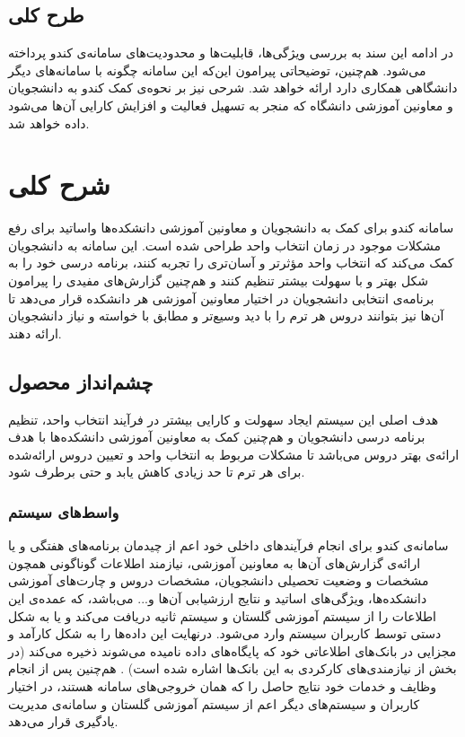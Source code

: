 \documentclass{report}
\begin{document}
\subsection{طرح کلی}
در ادامه این سند به بررسی ویژگی‌ها، قابلیت‌ها و محدودیت‌های سامانه‌ی کندو پرداخته می‌شود. هم‌چنین، توضیحاتی پیرامون این‌که این سامانه چگونه با سامانه‌های دیگر دانشگاهی همکاری دارد ارائه خواهد شد. شرحی نیز بر نحوه‌ی کمک کندو به دانشجویان و معاونین آموزشی دانشگاه که منجر به تسهیل فعالیت و افزایش کارایی آن‌ها
می‌شود داده خواهد شد.
  \section{شرح کلی}
  سامانه کندو برای کمک به دانشجویان و معاونین آموزشی دانشکده‌ها واساتید برای رفع مشکلات موجود در زمان انتخاب واحد طراحی شده است. این سامانه به دانشجویان کمک می‌کند که انتخاب واحد مؤثرتر و آسان‌تری را تجربه کنند، برنامه درسی خود را به شکل بهتر و با سهولت بیشتر تنظیم کنند و هم‌چنین گزارش‌های مفیدی را پیرامون  برنامه‌ی انتخابی دانشجویان در اختیار معاونین آموزشی هر دانشکده  قرار می‌دهد تا آن‌ها نیز بتوانند دروس هر ترم را با دید وسیع‌تر و مطابق با خواسته و نیاز  دانشجویان ارائه دهند.
  \subsection{چشم‌انداز محصول}
     هدف اصلی این سیستم ایجاد سهولت و کارایی بیشتر در فرآیند انتخاب واحد، تنظیم برنامه درسی دانشجویان و هم‌چنین کمک به معاونین  آموزشی دانشکده‌ها با هدف ارائه‌ی بهتر دروس می‌باشد تا مشکلات مربوط به انتخاب واحد و تعیین دروس ارائه‌شده برای هر ترم تا حد زیادی کاهش یابد و حتی برطرف شود.
 \subsubsection{واسط‌های سیستم}
 سامانه‌ی کندو برای انجام فرآیندهای داخلی خود اعم از چیدمان برنامه‌های هفتگی و یا ارائه‌ی گزارش‌های آن‌ها به معاونین آموزشی، نیازمند اطلاعات گوناگونی همچون مشخصات و وضعیت تحصیلی دانشجویان، مشخصات دروس و چارت‌های آموزشی دانشکده‌ها، ویژگی‌های اساتید و نتایج ارزشیابی آن‌ها و... می‌باشد، که عمده‌ی این اطلاعات را از سیستم آموزشی گلستان و سیستم ثانیه دریافت می‌کند و یا به شکل دستی توسط کاربران سیستم وارد می‌شود. درنهایت این داده‌ها را به شکل کارآمد و مجزایی در بانک‌های اطلاعاتی خود که پایگاه‌های  داده‌
 نامیده می‌شوند ذخیره می‌کند (در بخش
\hyperlink{one}{\underline{}}
از
نیازمندی‌های کارکردی
 به این بانک‌ها اشاره شده است) . هم‌چنین پس از انجام وظایف و خدمات خود نتایج حاصل را که همان خروجی‌های سامانه هستند، در اختیار کاربران و سیستم‌های دیگر اعم از سیستم آموزشی گلستان و سامانه‌ی مدیریت یادگیری 
  قرار می‌دهد.
 
\end{document}

